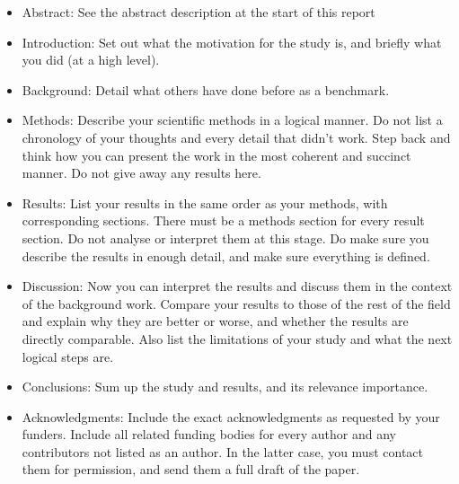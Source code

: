 \begin{itemize}
\item Abstract: See the abstract description at the start of this report
\item Introduction: Set out what the motivation for the study is, and briefly what you did (at a high level).
\item Background: Detail what others have done before as a benchmark.
\item Methods: Describe your scientific methods in a logical manner. Do not list a chronology of your thoughts and every detail that didn't work. Step back and think how you can present the work in the most coherent and succinct manner. Do not give away any results here.  
\item Results: List your results in the same order as your methods, with corresponding sections. There must be a methods section for every result section. Do not analyse or interpret them at this stage. Do make sure you describe the results in enough detail, and make sure everything is defined. 
\item Discussion: Now you can interpret the results and discuss them in the context of the background work. Compare your results to those of the rest of the field and explain why they are better or worse, and whether the results are directly comparable. Also list the limitations of your study and what the next logical steps are. 
\item Conclusions: Sum up the study and results, and its relevance importance. 
\item Acknowledgments: Include the exact acknowledgments as requested by your funders. Include all related funding bodies for every author and any contributors not listed as an author. In the latter case, you must contact them for permission, and send them a full draft of the paper. 
\end{itemize}




